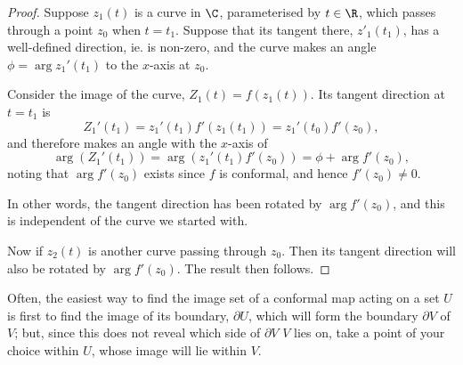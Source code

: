 \documentclass[a4paper]{article}
\begin{document}
\begin{proof}
  Suppose $z_1(t)$ is a curve in $\C$, parameterised by $t \in \R$, which passes through a point $z_0$ when $t = t_1$. Suppose that its tangent there, $z'_1(t_1)$, has a well-defined direction, ie. is non-zero, and the curve makes an angle $\phi = \arg z_1'(t_1)$ to the $x$-axis at $z_0$.

  Consider the image of the curve, $Z_1(t) = f(z_1(t))$. Its tangent direction at $t = t_1$ is
  \[
    Z_1'(t_1) = z_1'(t_1) f'(z_1(t_1)) = z_1'(t_0) f'(z_0),
  \]
  and therefore makes an angle with the $x$-axis of
  \[
    \arg (Z_1'(t_1)) = \arg(z_1'(t_1) f'(z_0)) = \phi + \arg f'(z_0),
  \]
  noting that $\arg f'(z_0)$ exists since $f$ is conformal, and hence $f'(z_0) \not= 0$.

  In other words, the tangent direction has been rotated by $\arg f'(z_0)$, and this is independent of the curve we started with.

  Now if $z_2(t)$ is another curve passing through $z_0$. Then its tangent direction will also be rotated by $\arg f'(z_0)$. The result then follows.
\end{proof}

Often, the easiest way to find the image set of a conformal map acting on a set $U$ is first to find the image of its boundary, $\partial U$, which will form the boundary $\partial V$ of $V$; but, since this does not reveal which side of $\partial V$ $V$ lies on, take a point of your choice within $U$, whose image will lie within $V$.
\end{document}
